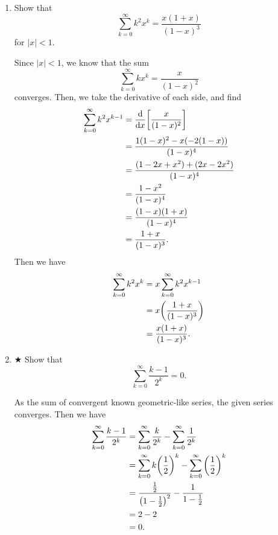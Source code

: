 \documentclass[AppendixA]{subfiles}
\begin{document}
\begin{enumerate}
		\item Show that
		\[
			\sum_{k = 0}^\infty k^2 x^k = \frac{x(1 + x)}{(1 - x)^3}
		\]
		for $|x| < 1$.
		\begin{answer}
			Since $|x| < 1$, we know that the sum
			\[
				\sum_{k = 0}^\infty kx^k = \frac{x}{(1-x)^2}
			\]
			converges. Then, we take the derivative of each side, and find
			\begin{align*}
				\sum_{k = 0}^\infty k^2x^{k - 1} &= \dv{}{x} \qty[\frac{x}{(1-x)^2}]\\
					&= \frac{1(1-x)^2 - x(-2(1 - x))}{(1-x)^4}\\
					&= \frac{(1 - 2x + x^2 )+ (2x - 2x^2)}{(1-x)^4}\\
					&= \frac{1 - x^2}{(1-x)^4}\\
					&= \frac{(1 - x)(1 + x)}{(1-x)^4}\\
					&= \frac{1 + x}{(1-x)^3}.
			\end{align*}
			Then we have
			\begin{align*}
				\sum_{k = 0}^\infty k^2 x^k &= x \sum_{k = 0}^\infty k^2x^{k - 1}\\
					&= x \qty(\frac{1 + x}{(1-x)^3})\\
					&= \frac{x(1 + x)}{(1-x)^3}.
			\end{align*}
		\end{answer}
		
		\item $\bigstar$ Show that
		\[
			\sum_{k = 0}^\infty \frac{k - 1}{2^k} = 0.
		\]
		\begin{answer}
			As the sum of convergent known geometric-like series, the given series converges. Then we have
			\begin{align*}
				\sum_{k = 0}^\infty \frac{k - 1}{2^k} &= \sum_{k = 0}^\infty \frac{k}{2^k} - \sum_{k = 0}^\infty \frac{1}{2^k}\\
					&= \sum_{k = 0}^\infty k\qty(\frac{1}{2})^k - \sum_{k = 0}^\infty \qty(\frac{1}{2})^k\\
					&= \frac{\frac{1}{2}}{\qty(1 - \frac{1}{2})^2} - \frac{1}{1 - \frac{1}{2}}\\
					&= 2 - 2\\
					&= 0.
			\end{align*}
		\end{answer}
		

\end{enumerate}
\end{document}
